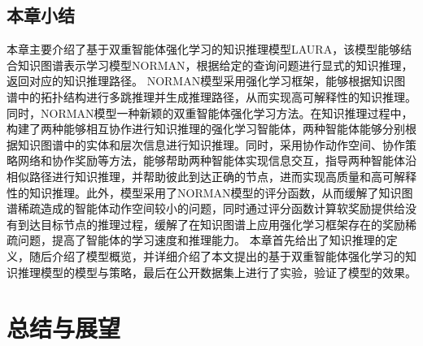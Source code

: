 \documentclass[algorithmlist, AutoFakeBold, AutoFakeSlant, figurelist, tablelist, nomlist, engineering]{seuthesix}
\begin{document}
\section{本章小结}
本章主要介绍了基于双重智能体强化学习的知识推理模型LAURA，该模型能够结合知识图谱表示学习模型NORMAN，根据给定的查询问题进行显式的知识推理，返回对应的知识推理路径。
NORMAN模型采用强化学习框架，能够根据知识图谱中的拓扑结构进行多跳推理并生成推理路径，从而实现高可解释性的知识推理。同时，NORMAN模型一种新颖的双重智能体强化学习方法。在知识推理过程中，构建了两种能够相互协作进行知识推理的强化学习智能体，两种智能体能够分别根据知识图谱中的实体和层次信息进行知识推理。同时，采用协作动作空间、协作策略网络和协作奖励等方法，能够帮助两种智能体实现信息交互，指导两种智能体沿相似路径进行知识推理，并帮助彼此到达正确的节点，进而实现高质量和高可解释性的知识推理。此外，模型采用了NORMAN模型的评分函数，从而缓解了知识图谱稀疏造成的智能体动作空间较小的问题，同时通过评分函数计算软奖励提供给没有到达目标节点的推理过程，缓解了在知识图谱上应用强化学习框架存在的奖励稀疏问题，提高了智能体的学习速度和推理能力。
本章首先给出了知识推理的定义，随后介绍了模型概览，并详细介绍了本文提出的基于双重智能体强化学习的知识推理模型的模型与策略，最后在公开数据集上进行了实验，验证了模型的效果。


\chapter{总结与展望}
\end{document}
